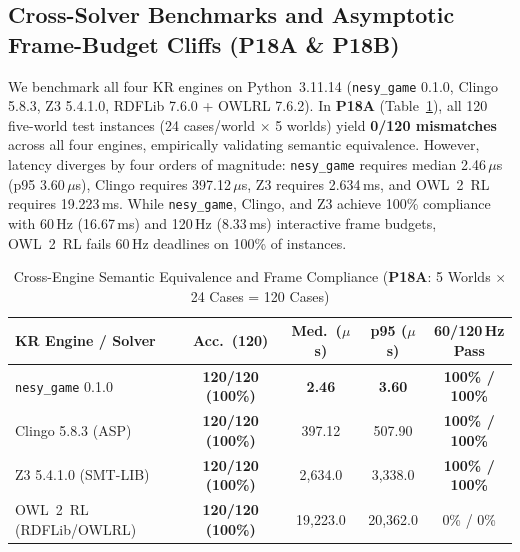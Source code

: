 \subsection{Cross-Solver Benchmarks and Asymptotic Frame-Budget Cliffs (\textbf{P18A} \& \textbf{P18B})}\label{sec:kr-benchmarks}
We benchmark all four KR engines on Python~3.11.14 (\texttt{nesy\_game} 0.1.0, Clingo 5.8.3, Z3 5.4.1.0, RDFLib 7.6.0 + OWLRL 7.6.2). In \textbf{P18A} (Table~\ref{tab:p18a}), all 120 five-world test instances (24 cases/world $\times$ 5 worlds) yield \textbf{0/120 mismatches} across all four engines, empirically validating semantic equivalence. However, latency diverges by four orders of magnitude: \texttt{nesy\_game} requires median 2.46\,$\mu$s (p95 3.60\,$\mu$s), Clingo requires 397.12\,$\mu$s, Z3 requires 2.634\,ms, and OWL~2~RL requires 19.223\,ms. While \texttt{nesy\_game}, Clingo, and Z3 achieve 100\% compliance with 60\,Hz (16.67\,ms) and 120\,Hz (8.33\,ms) interactive frame budgets, OWL~2~RL fails 60\,Hz deadlines on 100\% of instances.

\begin{table}[!tbp]
\caption{Cross-Engine Semantic Equivalence and Frame Compliance (\textbf{P18A}: 5 Worlds $\times$ 24 Cases = 120 Cases)}
\label{tab:p18a}
\centering
\scriptsize
\setlength{\tabcolsep}{2.5pt}
\begin{tabularx}{\columnwidth}{@{}>{\raggedright\arraybackslash}Xcccc@{}}
\toprule
\textbf{KR Engine / Solver} & \textbf{Acc.\ (120)} & \textbf{Med.\ ($\mu$s)} & \textbf{p95 ($\mu$s)} & \textbf{60/120\,Hz Pass} \\
\midrule
\texttt{nesy\_game} 0.1.0 & \textbf{120/120 (100\%)} & \textbf{2.46} & \textbf{3.60} & \textbf{100\% / 100\%} \\
Clingo 5.8.3 (ASP)~\cite{gebser2019clingo} & \textbf{120/120 (100\%)} & 397.12 & 507.90 & \textbf{100\% / 100\%} \\
Z3 5.4.1.0 (SMT-LIB)~\cite{demoura2008z3} & \textbf{120/120 (100\%)} & 2,634.0 & 3,338.0 & \textbf{100\% / 100\%} \\
OWL~2~RL (RDFLib/OWLRL)~\cite{motik2012owl2profiles} & \textbf{120/120 (100\%)} & 19,223.0 & 20,362.0 & 0\% / 0\% \\
\bottomrule
\end{tabularx}
\end{table}

